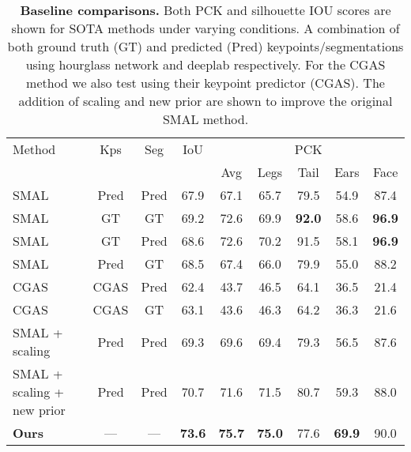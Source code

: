 \begin{table}[]
{
    \small
    \centering
    \begin{tabular}{@{}lcccccccc@{}}
    \toprule
    \multicolumn{1}{l}{Method} & 
    \multicolumn{1}{c}{Kps} & 
    \multicolumn{1}{c}{Seg} & 
    \multicolumn{1}{c}{IoU} & 
    \multicolumn{5}{c}{PCK} \\
    \multicolumn{4}{c}{} &
    \multicolumn{1}{c}{Avg} &
    \multicolumn{1}{c}{Legs} &
    \multicolumn{1}{c}{Tail} &
    \multicolumn{1}{c}{Ears} &
    \multicolumn{1}{c}{Face} \\
    \midrule
    SMAL~\cite{DBLP:journals/corr/ZuffiKJB16} & Pred & Pred & 67.9 & 67.1 & 65.7 & 79.5 & 54.9 & 87.4  \\
    SMAL & GT & GT &  69.2 & 72.6 & 69.9 & \textbf{92.0} & 58.6 & \textbf{96.9} \\
    SMAL & GT & Pred & 68.6 & 72.6 & 70.2 & 91.5 & 58.1 & \textbf{96.9} \\ 
    SMAL & Pred & GT & 68.5 & 67.4 & 66.0 & 79.9 & 55.0 & 88.2 \\ 
    \hline
    CGAS~\cite{biggs2018creatures} & CGAS & Pred & 62.4 & 43.7 & 46.5 & 64.1 & 36.5 & 21.4  \\
    CGAS & CGAS & GT & 63.1 & 43.6 & 46.3 & 64.2 & 36.3 & 21.6 \\
    \hline
    SMAL + scaling & Pred & Pred & 69.3 & 69.6 & 69.4 & 79.3 & 56.5 & 87.6 \\
    SMAL + scaling + new prior & Pred & Pred & 70.7 & 71.6 & 71.5 & 80.7 & 59.3 & 88.0 \\
    \hline
    \textbf{Ours} & --- & --- & \textbf{73.6} & \textbf{75.7} & \textbf{75.0} & 77.6 & \textbf{69.9} & 90.0 \\
    \bottomrule 
    \end{tabular}
    \vspace{1em}
    \caption{\label{tab:baselines}\textbf{Baseline comparisons.} Both PCK and silhouette IOU scores are shown for SOTA methods under varying conditions. A combination of both ground truth (GT) and predicted (Pred) keypoints/segmentations using hourglass network and deeplab respectively. For the CGAS method we also test using their keypoint predictor (CGAS). The addition of scaling and new prior are shown to improve the original SMAL method.}
}
\end{table}